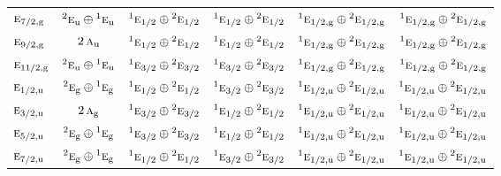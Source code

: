 \documentclass[10pt,a4paper]{article}
\numberwithin{equation}{section}
\newcommand{\irr}[1]{\text{\normalfont\scshape #1}}
\newcommand{\conjpair}[1]{{}^{#1}}
\newcommand{\ptag}[1]{\mathrm{#1}}
\begin{document}
{\begin{longtable}{@{}lccccc@{}}
$\irr{e}_{7/2,\ptag{g}}$ & $\conjpair{2}\irr{e}_{\ptag{u}}\oplus \conjpair{1}\irr{e}_{\ptag{u}}$ & $\conjpair{1}\irr{e}_{1/2}\oplus \conjpair{2}\irr{e}_{1/2}$ & $\conjpair{1}\irr{e}_{1/2}\oplus \conjpair{2}\irr{e}_{1/2}$ & $\conjpair{1}\irr{e}_{1/2,\ptag{g}}\oplus \conjpair{2}\irr{e}_{1/2,\ptag{g}}$ & $\conjpair{1}\irr{e}_{1/2,\ptag{g}}\oplus \conjpair{2}\irr{e}_{1/2,\ptag{g}}$\\
$\irr{e}_{9/2,\ptag{g}}$ & $2\,\irr{a}_{\ptag{u}}$ & $\conjpair{1}\irr{e}_{1/2}\oplus \conjpair{2}\irr{e}_{1/2}$ & $\conjpair{1}\irr{e}_{1/2}\oplus \conjpair{2}\irr{e}_{1/2}$ & $\conjpair{1}\irr{e}_{1/2,\ptag{g}}\oplus \conjpair{2}\irr{e}_{1/2,\ptag{g}}$ & $\conjpair{1}\irr{e}_{1/2,\ptag{g}}\oplus \conjpair{2}\irr{e}_{1/2,\ptag{g}}$\\
$\irr{e}_{11/2,\ptag{g}}$ & $\conjpair{2}\irr{e}_{\ptag{u}}\oplus \conjpair{1}\irr{e}_{\ptag{u}}$ & $\conjpair{1}\irr{e}_{3/2}\oplus \conjpair{2}\irr{e}_{3/2}$ & $\conjpair{1}\irr{e}_{3/2}\oplus \conjpair{2}\irr{e}_{3/2}$ & $\conjpair{1}\irr{e}_{1/2,\ptag{g}}\oplus \conjpair{2}\irr{e}_{1/2,\ptag{g}}$ & $\conjpair{1}\irr{e}_{1/2,\ptag{g}}\oplus \conjpair{2}\irr{e}_{1/2,\ptag{g}}$\\
$\irr{e}_{1/2,\ptag{u}}$ & $\conjpair{2}\irr{e}_{\ptag{g}}\oplus \conjpair{1}\irr{e}_{\ptag{g}}$ & $\conjpair{1}\irr{e}_{1/2}\oplus \conjpair{2}\irr{e}_{1/2}$ & $\conjpair{1}\irr{e}_{3/2}\oplus \conjpair{2}\irr{e}_{3/2}$ & $\conjpair{1}\irr{e}_{1/2,\ptag{u}}\oplus \conjpair{2}\irr{e}_{1/2,\ptag{u}}$ & $\conjpair{1}\irr{e}_{1/2,\ptag{u}}\oplus \conjpair{2}\irr{e}_{1/2,\ptag{u}}$\\
$\irr{e}_{3/2,\ptag{u}}$ & $2\,\irr{a}_{\ptag{g}}$ & $\conjpair{1}\irr{e}_{3/2}\oplus \conjpair{2}\irr{e}_{3/2}$ & $\conjpair{1}\irr{e}_{1/2}\oplus \conjpair{2}\irr{e}_{1/2}$ & $\conjpair{1}\irr{e}_{1/2,\ptag{u}}\oplus \conjpair{2}\irr{e}_{1/2,\ptag{u}}$ & $\conjpair{1}\irr{e}_{1/2,\ptag{u}}\oplus \conjpair{2}\irr{e}_{1/2,\ptag{u}}$\\
$\irr{e}_{5/2,\ptag{u}}$ & $\conjpair{2}\irr{e}_{\ptag{g}}\oplus \conjpair{1}\irr{e}_{\ptag{g}}$ & $\conjpair{1}\irr{e}_{3/2}\oplus \conjpair{2}\irr{e}_{3/2}$ & $\conjpair{1}\irr{e}_{1/2}\oplus \conjpair{2}\irr{e}_{1/2}$ & $\conjpair{1}\irr{e}_{1/2,\ptag{u}}\oplus \conjpair{2}\irr{e}_{1/2,\ptag{u}}$ & $\conjpair{1}\irr{e}_{1/2,\ptag{u}}\oplus \conjpair{2}\irr{e}_{1/2,\ptag{u}}$\\
$\irr{e}_{7/2,\ptag{u}}$ & $\conjpair{2}\irr{e}_{\ptag{g}}\oplus \conjpair{1}\irr{e}_{\ptag{g}}$ & $\conjpair{1}\irr{e}_{1/2}\oplus \conjpair{2}\irr{e}_{1/2}$ & $\conjpair{1}\irr{e}_{3/2}\oplus \conjpair{2}\irr{e}_{3/2}$ & $\conjpair{1}\irr{e}_{1/2,\ptag{u}}\oplus \conjpair{2}\irr{e}_{1/2,\ptag{u}}$ & $\conjpair{1}\irr{e}_{1/2,\ptag{u}}\oplus \conjpair{2}\irr{e}_{1/2,\ptag{u}}$\\

\end{longtable}}
\end{document}
